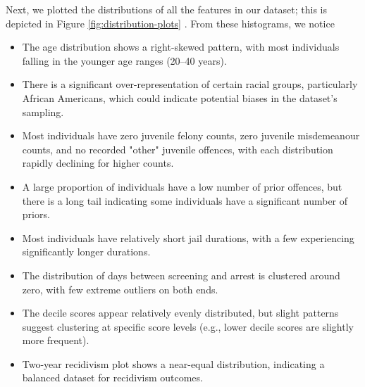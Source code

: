 Next, we plotted the distributions of all the features in our dataset; this is depicted in Figure \ref{fig:distribution-plots} . From these histograms, we notice 
\begin{itemize}
	\item The age distribution shows a right-skewed pattern, with most individuals falling in the younger age ranges (20–40 years).
	
	\item There is a significant over-representation of certain racial groups, particularly African Americans, which could indicate potential biases in the dataset's sampling.
	
	\item Most individuals have zero juvenile felony counts, zero juvenile misdemeanour counts, and no recorded "other" juvenile offences, with each distribution rapidly declining for higher counts.
	
	\item A large proportion of individuals have a low number of prior offences, but there is a long tail indicating some individuals have a significant number of priors.
	
	\item Most individuals have relatively short jail durations, with a few experiencing significantly longer durations.
	
	\item The distribution of days between screening and arrest is clustered around zero, with few extreme outliers on both ends.
	
	\item The decile scores appear relatively evenly distributed, but slight patterns suggest clustering at specific score levels (e.g., lower decile scores are slightly more frequent).
	
	\item Two-year recidivism plot shows a near-equal distribution, indicating a balanced dataset for recidivism outcomes.
\end{itemize}


